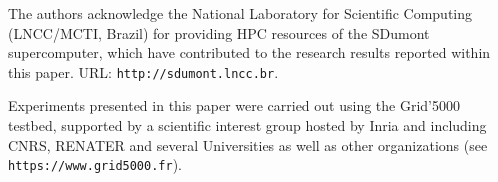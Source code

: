 \documentclass[a4paper, 10pt, conference]{IEEEtran}  %
\begin{document}
The authors acknowledge the National Laboratory for Scientific Computing (LNCC/MCTI, Brazil) for providing HPC resources of the SDumont supercomputer, which have contributed to the research results reported within this paper. URL: \texttt{http://sdumont.lncc.br}.

Experiments presented in this paper were carried out using the Grid'5000 testbed, supported by a scientific interest group hosted by Inria and including CNRS, RENATER and several Universities as well as other organizations (see \texttt{https://www.grid5000.fr}).




\end{document}
